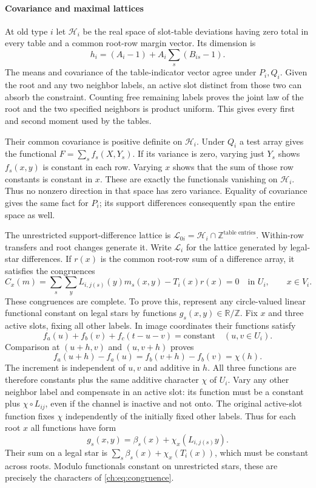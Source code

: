 \paragraph{Covariance and maximal lattices}
At old type $i$ let $\mathcal H_i$ be the real space of slot-table deviations having zero total in every table and a common root-row margin vector. Its dimension is
\[
 h_i=(A_i-1)+A_i\sum_s(B_{is}-1).
\]
The means and covariance of the table-indicator vector agree under $P_i,Q_i$. Given the root and any two neighbor labels, an active slot distinct from those two can absorb the constraint. Counting free remaining labels proves the joint law of the root and the two specified neighbors is product uniform. This gives every first and second moment used by the tables.

Their common covariance is positive definite on $\mathcal H_i$. Under $Q_i$ a test array gives the functional $F=\sum_s f_s(X,Y_s)$. If its variance is zero, varying just $Y_s$ shows $f_s(x,y)$ is constant in each row. Varying $x$ shows that the sum of those row constants is constant in $x$. These are exactly the functionals vanishing on $\mathcal H_i$. Thus no nonzero direction in that space has zero variance. Equality of covariance gives the same fact for $P_i$; its support differences consequently span the entire space as well.

The unrestricted support-difference lattice is $\mathcal L_{0i}=\mathcal H_i\cap\mathbb Z^{\text{table entries}}$. Within-row transfers and root changes generate it. Write $\mathcal L_i$ for the lattice generated by legal-star differences. If $r(x)$ is the common root-row sum of a difference array, it satisfies the congruences
\begin{equation}\label{ch:eq:congruence}
 C_x(m)=\sum_s\sum_yL_{i,j(s)}(y)m_s(x,y)-T_i(x)r(x)=0
 \quad\text{in }U_i,\qquad x\in V_i.
\end{equation}
These congruences are complete. To prove this, represent any circle-valued linear functional constant on legal stars by functions $g_s(x,y)\in\mathbb R/\mathbb Z$. Fix $x$ and three active slots, fixing all other labels. In image coordinates their functions satisfy
\[
 f_a(u)+f_b(v)+f_c(t-u-v)=\text{constant}\quad(u,v\in U_i).
\]
Comparison at $(u+h,v)$ and $(u,v+h)$ proves
\[
 f_a(u+h)-f_a(u)=f_b(v+h)-f_b(v)=\chi(h).
\]
The increment is independent of $u,v$ and additive in $h$. All three functions are therefore constants plus the same additive character $\chi$ of $U_i$. Vary any other neighbor label and compensate in an active slot: its function must be a constant plus $\chi\circ L_{ij}$, even if the channel is inactive and not onto. The original active-slot function fixes $\chi$ independently of the initially fixed other labels. Thus for each root $x$ all functions have form
\[
 g_s(x,y)=\beta_s(x)+\chi_x(L_{i,j(s)}y).
\]
Their sum on a legal star is $\sum_s\beta_s(x)+\chi_x(T_i(x))$, which must be constant across roots. Modulo functionals constant on unrestricted stars, these are precisely the characters of \eqref{ch:eq:congruence}.

